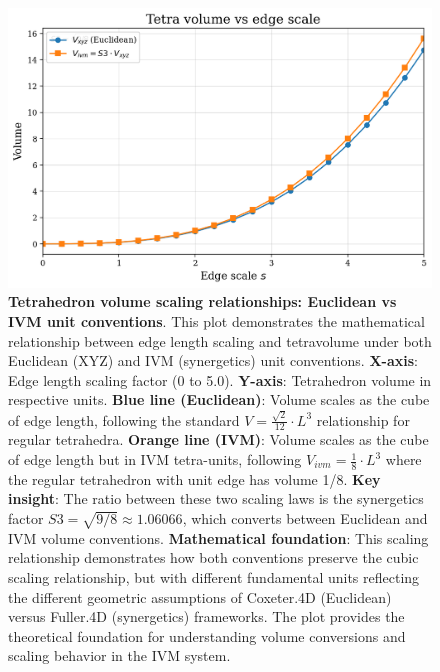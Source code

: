 \documentclass[
  10pt,
]{article}
\begin{document}
\begin{figure}
\centering
\includegraphics{../output/figures/volumes_scale_plot.png}
\caption{\textbf{Tetrahedron volume scaling relationships: Euclidean vs
IVM unit conventions}. This plot demonstrates the mathematical
relationship between edge length scaling and tetravolume under both
Euclidean (XYZ) and IVM (synergetics) unit conventions. \textbf{X-axis}:
Edge length scaling factor (0 to 5.0). \textbf{Y-axis}: Tetrahedron
volume in respective units. \textbf{Blue line (Euclidean)}: Volume
scales as the cube of edge length, following the standard
\(V = \frac{\sqrt{2}}{12} \cdot L^3\) relationship for regular
tetrahedra. \textbf{Orange line (IVM)}: Volume scales as the cube of
edge length but in IVM tetra-units, following
\(V_{ivm} = \frac{1}{8} \cdot L^3\) where the regular tetrahedron with
unit edge has volume 1/8. \textbf{Key insight}: The ratio between these
two scaling laws is the synergetics factor
\(S3 = \sqrt{9/8} \approx 1.06066\), which converts between Euclidean
and IVM volume conventions. \textbf{Mathematical foundation}: This
scaling relationship demonstrates how both conventions preserve the
cubic scaling relationship, but with different fundamental units
reflecting the different geometric assumptions of Coxeter.4D (Euclidean)
versus Fuller.4D (synergetics) frameworks. The plot provides the
theoretical foundation for understanding volume conversions and scaling
behavior in the IVM system.}
\end{figure}
\end{document}
